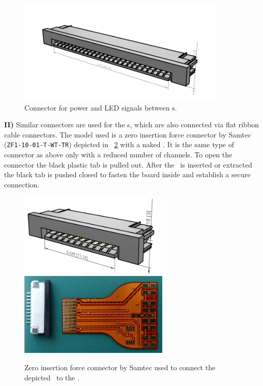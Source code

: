 \documentclass[../BTOF_summary.tex]{subfiles}
\begin{document}
\begin{figure}[htbp]
	\centering
	\includegraphics[height=5cm]{fig/Connector_ZF1-25-01.png}
	\caption{Connector for power and LED signals between \railboard s.}
	\label{fig:Railboard_power_connection}
\end{figure}

\textbf{II)} Similar connectors are used for the \sensorboard s, which are also connected via flat ribbon cable connectors.
The model used is a zero insertion force connector by Samtec (\texttt{ZF1-10-01-T-WT-TR}) depicted in \fig~\ref{fig:SensorBoard_connector} with a naked \sensorboard .
It is the same type of connector as above only with a reduced number of channels.
To open the connector the black plastic tab is pulled out.
After the \sensorboard\ is inserted or extracted the black tab is pushed closed to fasten the board inside and establish a secure connection.

\begin{figure}[htbp]
	\centering
	\includegraphics[height=4cm]{fig/SensorBoard_connector_drawing.png}
	\includegraphics[height=4cm]{fig/SensorBoard_connector.png}
	\caption{Zero insertion force connector by Samtec used to connect the depicted \sensorboard\ to the \railboard .}
	\label{fig:SensorBoard_connector}
\end{figure}
\end{document}
